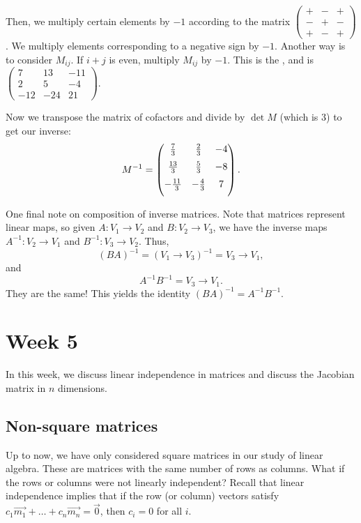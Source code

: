 \documentclass[a4paper, 12pt,oneside,openany]{book}
\begin{document}
Then, we multiply certain elements by $-1$ according to the matrix $\begin{pmatrix} + & - & + \\ - & + & - \\ + & - & + \end{pmatrix}$. We multiply elements corresponding to a negative sign by $-1$. Another way is to consider $M_{ij}$. If $i+j$ is even, multiply $M_{ij}$ by $-1$. This is the , and is $\begin{pmatrix} 7 & 13 & -11 \\ 2 & 5 & -4 \\ -12 & -24 & 21 \end{pmatrix}.$

Now we transpose the matrix of cofactors and divide by $\det{M}$ (which is 3) to get our inverse: $$M^{-1}= \begin{pmatrix} \medskip \frac{7}{3} & \frac{2}{3} & -4 \\ \medskip \frac{13}{3} & \frac{5}{3} & -8 \\ \medskip -\frac{11}{3} & -\frac{4}{3} & 7 \end{pmatrix}.$$

One final note on composition of inverse matrices. Note that matrices represent linear maps, so given $A: V_1 \to V_2$ and $B: V_2 \to V_3$, we have the inverse maps $A^{-1}: V_2 \to V_1$ and $B^{-1}: V_3 \to V_2$. Thus, $$(BA)^{-1} = (V_1 \to V_3)^{-1} = V_3 \to V_1,$$ and $$A^{-1}B^{-1} = V_3 \to V_1.$$ They are the same! This yields the identity $(BA)^{-1} = A^{-1}B^{-1}.$

\chapter{Week 5}

In this week, we discuss linear independence in matrices and discuss the Jacobian matrix in $n$ dimensions.

\section{Non-square matrices}

Up to now, we have only considered square matrices in our study of linear algebra. These are matrices with the same number of rows as columns. What if the rows or columns were not linearly independent? Recall that linear independence implies that if the row (or column) vectors satisfy $c_1\vec{m_1} + \dots + c_n \vec{m_n} = \vec{0}$, then $c_i = 0$ for all $i$.
\end{document}
